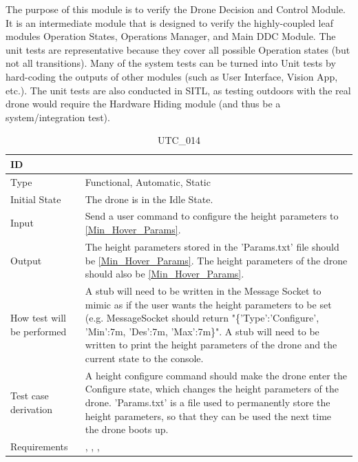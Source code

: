 \documentclass[12pt, titlepage]{article}
\begin{document}
The purpose of this module is to verify the Drone Decision and Control Module. It is an intermediate module that is designed to verify the highly-coupled leaf modules Operation States, Operations Manager, and Main DDC Module. The unit tests are representative because they cover all possible Operation states (but not all transitions). Many of the system tests can be turned into Unit tests by hard-coding the outputs of other modules (such as User Interface, Vision App, etc.). The unit tests are also conducted in SITL, as testing outdoors with the real drone would require the Hardware Hiding module (and thus be a system/integration test).

\begin{table}[!h]
\begin{center}
\caption {UTC\_014}
\label{tab:UTC_014}
\begin{tabular}{ | m{3.2cm} | m{12.2cm} | } 
\hline
ID & \nameref{tab:UTC_014} \\ 
\hline
Type &  Functional, Automatic, Static  \\ 
\hline
Initial State & The drone is in the Idle State. \\ 
\hline
Input &  Send a user command to configure the height parameters to \ref{Min_Hover_Params}. \\ 
\hline
Output &  The height parameters stored in the 'Params.txt' file should be \ref{Min_Hover_Params}. The height parameters of the drone should also be \ref{Min_Hover_Params}. \\ 
\hline
How test will be performed & A stub will need to be written in the Message Socket to mimic as if the user wants the height parameters to be set (e.g. MessageSocket should return "\{'Type':'Configure', 'Min':7m, 'Des':7m, 'Max':7m\}". A stub will need to be written to print the height parameters of the drone and the current state to the console.\\ 
\hline
Test case derivation & A height configure command should make the drone enter the Configure state, which changes the height parameters of the drone. 'Params.txt' is a file used to permanently store the height parameters, so that they can be used the next time the drone boots up. \\ 
\hline
Requirements & \nameref{STA_004}, \nameref{GEN_003}, \nameref{TRANS_003}, \nameref{TRANS_015} \\ 
\hline
\end{tabular}
\end{center}
\end{table}
\end{document}
